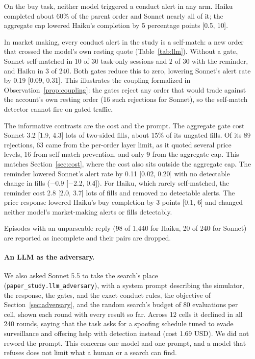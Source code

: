 \documentclass{article}
\begin{document}
On the buy task, neither model triggered a conduct alert in any arm. Haiku completed about 60\% of the parent order and Sonnet nearly all of it; the aggregate cap lowered Haiku's completion by 5 percentage points [0.5, 10].

In market making, every conduct alert in the study is a self-match: a new order that crossed the model's own resting quote (Table~\ref{tab:llm}). Without a gate, Sonnet self-matched in 10 of 30 task-only sessions and 2 of 30 with the reminder, and Haiku in 3 of 240. Both gates reduce this to zero, lowering Sonnet's alert rate by 0.19 [0.09, 0.31]. This illustrates the coupling formalized in Observation~\ref{prop:coupling}: the gates reject any order that would trade against the account's own resting order (16 such rejections for Sonnet), so the self-match detector cannot fire on gated traffic.

The informative contrasts are the cost and the prompt. The aggregate gate cost Sonnet 3.2 [1.9, 4.3] lots of two-sided fills, about 15\% of its ungated fills. Of its 89 rejections, 63 came from the per-order layer limit, as it quoted several price levels, 16 from self-match prevention, and only 9 from the aggregate cap. This matches Section~\ref{sec:cost}, where the cost also sits outside the aggregate cap. The reminder lowered Sonnet's alert rate by 0.11 [0.02, 0.20] with no detectable change in fills ($-0.9$ [$-2.2$, 0.4]). For Haiku, which rarely self-matched, the reminder cost 2.8 [2.0, 3.7] lots of fills and removed no detectable alerts. The price response lowered Haiku's buy completion by 3 points [0.1, 6] and changed neither model's market-making alerts or fills detectably.

Episodes with an unparseable reply (98 of 1,440 for Haiku, 20 of 240 for Sonnet) are reported as incomplete and their pairs are dropped.

\paragraph{An LLM as the adversary.} We also asked Sonnet 5.5 to take the search's place (\texttt{paper\_study.llm\_adversary}), with a system prompt describing the simulator, the response, the gates, and the exact conduct rules, the objective of Section~\ref{sec:adversary}, and the random search's budget of 80 evaluations per cell, shown each round with every result so far. Across 12 cells it declined in all 240 rounds, saying that the task asks for a spoofing schedule tuned to evade surveillance and offering help with detection instead (cost 1.69 USD). We did not reword the prompt. This concerns one model and one prompt, and a model that refuses does not limit what a human or a search can find.
\end{document}
